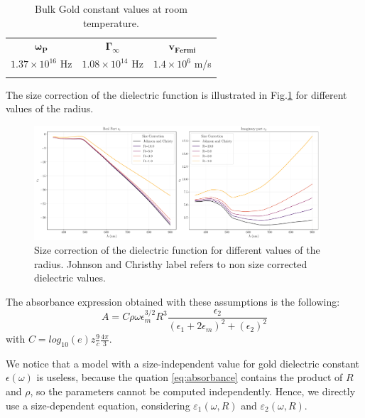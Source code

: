 \documentclass[prb,twocolumn]{revtex4-1}
\begin{document}
    \begin{table}[H]
    \centering
    \begin{tabular*}{\columnwidth}{@{\extracolsep{\fill}}ccc}
    \toprule
    \( \pmb{ \omega_P } \) \cite{PhysRevB.6.4370} & \(\pmb{ \Gamma_{\infty} } \) \cite{PhysRevB.6.4370} & \( \pmb{ v_{Fermi} }  \) \cite{ashcroft2011solid} \\
    \colrule
    \(1.37\times 10^{16} \) Hz & \(1.08 \times 10^{14} \) Hz & \(1.4     \times 10^{6}\) m/s \\	   
    \botrule
    \end{tabular*}
    \caption{Bulk Gold constant values at room temperature.}
    \label{tab:constant_bulk}
    \end{table}
    
    
The size correction of the dielectric function is illustrated in Fig.\ref{fig:size_correction} for different values of the radius.
\begin{figure}[H]
    \begin{minipage}[l]{1.0\columnwidth}
    \centering
    \includegraphics[width=0.95\textwidth]{images/os/size_correction.pdf}
    \caption{Size correction of the dielectric function for different values of the radius. Johnson and Christhy label refers to non size corrected dielectric values.}
    \label{fig:size_correction}
    \end{minipage}
\end{figure}


The absorbance expression obtained with these assumptions is the following:
\begin{equation}
A = C \rho \omega \epsilon_m^{3/2} R^3 \frac{\epsilon_2  }{(\epsilon_1 + 2\epsilon_m)^2+(\epsilon_2 )^2}
\label{eq:absorbance}
\end{equation}
with $C = log_{10}(e)z\frac{9}{c}\frac{4\pi}{3}$.

We notice that a model with a size-independent value for gold dielectric constant $\epsilon(\omega)$ is useless, because the quation \ref{eq:absorbance} contains the product of $R$ and $\rho$, so the parameters cannot be computed independently. Hence, we directly use a size-dependent equation, considering $\varepsilon_1(\omega,R)$ and $\varepsilon_2(\omega,R)$.
\end{document}
